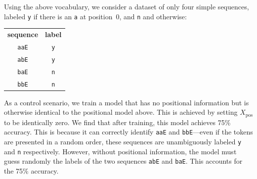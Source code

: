 \documentclass{article}
\begin{document}
Using the above vocabulary, we consider a dataset of only four simple
sequences, labeled \texttt{y} if there is an \texttt{a} at position~0,
and \texttt{n} and otherwise:
\begin{center}
\begin{tabular}{cc}
  \textbf{sequence} & \textbf{label} \\
  \texttt{aaE} & \texttt{y} \\
  \texttt{abE} & \texttt{y} \\
  \texttt{baE} & \texttt{n} \\
  \texttt{bbE} & \texttt{n} \\
\end{tabular}
\end{center}
As a control scenario, we train a model that has no positional
information but is otherwise identical to the positional model
above. This is achieved by setting $X_\text{pos}$ to be identically
zero. We find that after training, this model achieves 75\%
accuracy. This is because it can correctly identify \texttt{aaE} and
\texttt{bbE}---even if the tokens are presented in a random order,
these sequences are unambiguously labeled \texttt{y} and \texttt{n}
respectively. However, without positional information, the model must
guess randomly the labels of the two sequences \texttt{abE} and
\texttt{baE}. This accounts for the 75\% accuracy.
\end{document}
